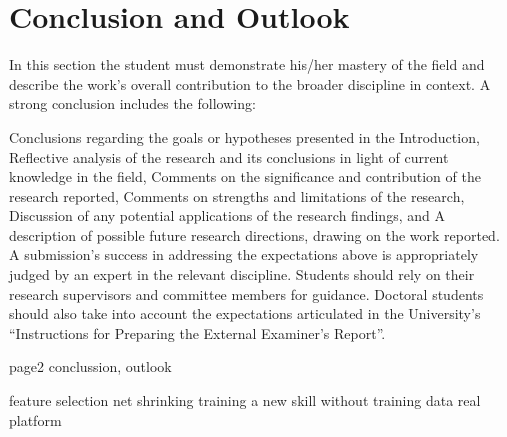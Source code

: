 \chapter{Conclusion and Outlook} \label{chap:conclusion}

In this section the student must demonstrate his/her mastery of the field and describe the work's overall contribution to the broader discipline in context. A strong conclusion includes the following:

Conclusions regarding the goals or hypotheses presented in the Introduction,
Reflective analysis of the research and its conclusions in light of current knowledge in the field,
Comments on the significance and contribution of the research reported,
Comments on strengths and limitations of the research,
Discussion of any potential applications of the research findings, and
A description of possible future research directions, drawing on the work reported.
A submission's success in addressing the expectations above is appropriately judged by an expert in the relevant discipline. Students should rely on their research supervisors and committee members for guidance. Doctoral students should also take into account the expectations articulated in the University's “Instructions for Preparing the External Examiner's Report”.



\newpage
page2 conclussion, outlook

feature selection
net shrinking
training a new skill without training data
real platform